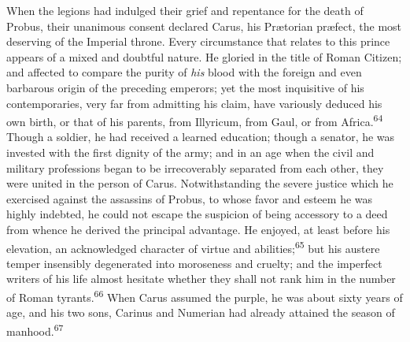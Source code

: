 When the legions had indulged their grief and repentance for the
death of Probus, their unanimous consent declared Carus, his
Prætorian præfect, the most deserving of the Imperial throne.
Every circumstance that relates to this prince appears of a mixed
and doubtful nature. He gloried in the title of Roman Citizen;
and affected to compare the purity of \textit{his} blood with the
foreign and even barbarous origin of the preceding emperors; yet
the most inquisitive of his contemporaries, very far from
admitting his claim, have variously deduced his own birth, or
that of his parents, from Illyricum, from Gaul, or from Africa.\textsuperscript{64}
Though a soldier, he had received a learned education; though
a senator, he was invested with the first dignity of the army;
and in an age when the civil and military professions began to be
irrecoverably separated from each other, they were united in the
person of Carus. Notwithstanding the severe justice which he
exercised against the assassins of Probus, to whose favor and
esteem he was highly indebted, he could not escape the suspicion
of being accessory to a deed from whence he derived the principal
advantage. He enjoyed, at least before his elevation, an
acknowledged character of virtue and abilities;\textsuperscript{65} but his
austere temper insensibly degenerated into moroseness and
cruelty; and the imperfect writers of his life almost hesitate
whether they shall not rank him in the number of Roman tyrants.\textsuperscript{66}
When Carus assumed the purple, he was about sixty years of
age, and his two sons, Carinus and Numerian had already attained
the season of manhood.\textsuperscript{67}





